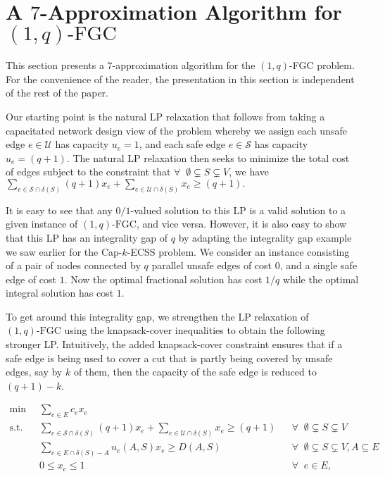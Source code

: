 \documentclass[11pt]{article}
\newcommand{\safe}{\mathscr{S}}
\newcommand{\unsafe}{\mathscr{U}}
\newcommand{\fgc}{\mathrm{FGC}}
\newcommand{\oneqfgc}{(1,q)\text{-}\fgc}
\newcommand{\oneqfgcapx}{7}
\begin{document}
\section{A $\oneqfgcapx$-Approximation Algorithm for $\oneqfgc$ \label{sec:oneqfgc}}
{
This section presents a $\oneqfgcapx$-approximation algorithm for the $(1,q)$-FGC problem.
For the convenience of the reader, the presentation in this section is independent of the rest of the paper. 

Our starting point is the natural LP relaxation that follows from taking a capacitated network design view of the problem whereby we assign each unsafe edge $e \in \unsafe$ has capacity $u_e=1$, and
each safe edge $e \in \safe$ has capacity $u_e=(q+1)$. The natural LP relaxation then seeks to minimize the total cost of edges subject to the constraint that $\forall\;\; \emptyset\subsetneq S\subsetneq V$, we have $\sum_{e\in\safe\cap\delta(S)} (q+1) x_e + \sum_{e\in\unsafe\cap\delta(S)} x_e \geq (q+1).$

It is easy to see that any $0/1$-valued solution to this LP is a valid solution to a given instance of  $\oneqfgc$, and vice versa.
However, it is also easy to show that this LP has an integrality gap of $q$ by adapting the integrality gap example we saw earlier for the Cap-$k$-ECSS problem. We consider an instance consisting of a pair of nodes connected by $q$ parallel unsafe edges of cost $0$, and a single safe edge of cost $1$. Now the optimal fractional solution has cost $1/q$ while the optimal integral solution has cost $1$.


To get around this integrality gap, we strengthen the LP relaxation of $\oneqfgc$ using the knapsack-cover inequalities to obtain the following stronger LP. Intuitively, the added knapsack-cover constraint ensures that if a safe edge is being used to cover a cut that is partly being covered by unsafe edges, say by $k$ of them, then the capacity of the safe edge is reduced to $(q+1)-k$.

\begin{align*}\label{KCLP:oneqfgc}
    \min\;\;&\sum_{e\in E}c_e x_e \tag{KCLP:$(1,q)$-FGC}\\
    \text{s.t.}\;\;& \sum_{e\in\safe\cap\delta(S)} (q+1) x_e + \sum_{e\in\unsafe\cap\delta(S)} x_e \geq (q+1) && \forall\;\; \emptyset\subsetneq S\subsetneq V \\
    & \sum_{e\in E\cap\delta(S) - A} u_e(A,S) x_e \geq D(A,S) && \forall\;\; \emptyset\subsetneq S\subsetneq V, A\subseteq E \\
    &0 \leq x_e \leq 1 && \forall\;\; e\in E,
\end{align*}

}
\end{document}

